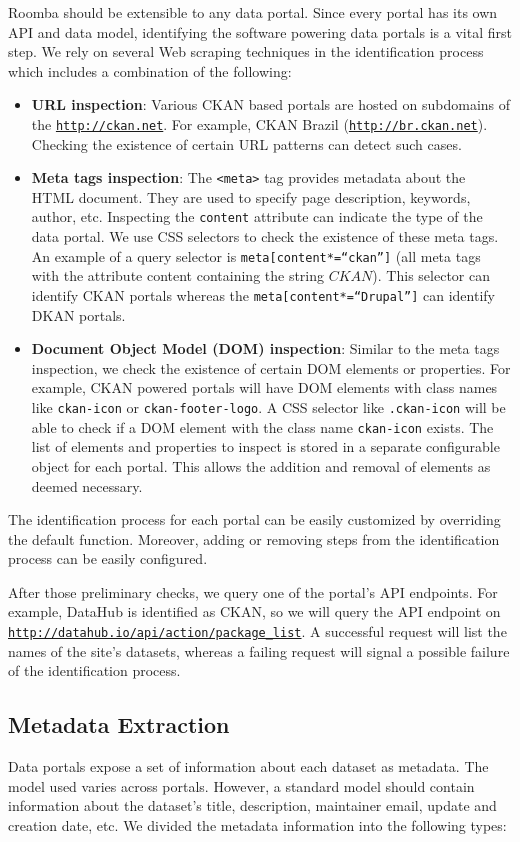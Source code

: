\documentclass[runningheads,a4paper]{../../Util/LaTEX/llncs}
\begin{document}
Roomba should be extensible to any data portal. Since every portal has its own API and data model, identifying the software powering data portals is a vital first step. We rely on several Web scraping techniques in the identification process which includes a combination of the following:
\begin{itemize}
  \item \textbf{URL inspection}: Various CKAN based portals are hosted on subdomains of the \texttt{\url{http://ckan.net}}. For example, CKAN Brazil (\texttt{\url{http://br.ckan.net}}). Checking the existence of certain URL patterns can detect such cases.
  \item \textbf{Meta tags inspection}: The \texttt{<meta>} tag provides metadata about the HTML document. They are used to specify page description, keywords, author, etc. Inspecting the \texttt{content} attribute can indicate the type of the data portal. We use CSS selectors to check the existence of these meta tags. An example of a query selector is \texttt{meta[content*=``ckan'']} (all meta tags with the attribute content containing the string $CKAN$). This selector can identify CKAN portals whereas the \texttt{meta[content*=``Drupal'']} can identify DKAN portals.
  \item \textbf{Document Object Model (DOM) inspection}: Similar to the meta tags inspection, we check the existence of certain DOM elements or properties. For example, CKAN powered portals will have DOM elements with class names like \texttt{ckan-icon} or \texttt{ckan-footer-logo}. A CSS selector like \texttt{.ckan-icon} will be able to check if a DOM element with the class name \texttt{ckan-icon} exists.
  The list of elements and properties to inspect is stored in a separate configurable object for each portal. This allows the addition and removal of elements as deemed necessary.
\end{itemize}
The identification process for each portal can be easily customized by overriding the default function. Moreover, adding or removing steps from the identification process can be easily configured.

After those preliminary checks, we query one of the portal's API endpoints. For example, DataHub is identified as CKAN, so we will query the API endpoint on \texttt{\url{http://datahub.io/api/action/package\_list}}. A successful request will list the names of the site's datasets, whereas a failing request will signal a possible failure of the identification process.

\subsection{Metadata Extraction}
Data portals expose a set of information about each dataset as metadata. The model used varies across portals. However, a standard model should contain information about the dataset's title, description, maintainer email, update and creation date, etc. We divided the metadata information into the following types:
\end{document}
